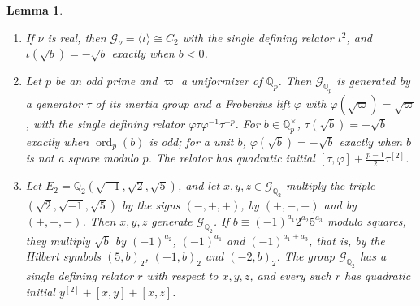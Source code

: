 \documentclass[11pt]{amsart}
\numberwithin{equation}{section}
\newtheorem{lemma}[equation]{Lemma}
\theoremstyle{definition}
\theoremstyle{remark}
\newcommand{\Q}{\mathbb Q}
\begin{document}
\begin{lemma}\label{tw:local-groups}
\begin{enumerate}
\item[(a)] If $\nu$ is real, then $\mathcal G_\nu=\langle\iota\rangle\cong C_2$
 with the single defining relator $\iota^2$, and $\iota(\sqrt b)=-\sqrt b$
 exactly when $b<0$.
\item[(b)] Let $p$ be an odd prime and $\varpi$ a uniformizer of $\Q_p$. Then
 $\mathcal G_{\Q_p}$ is generated by a generator $\tau$ of its inertia group
 and a Frobenius lift $\varphi$ with $\varphi(\sqrt\varpi)=\sqrt\varpi$, with
 the single defining relator $\varphi\tau\varphi^{-1}\tau^{-p}$. For
 $b\in\Q_p^\times$, $\tau(\sqrt b)=-\sqrt b$ exactly when $\operatorname{ord}_p(b)$ is odd;
 for a unit $b$, $\varphi(\sqrt b)=-\sqrt b$ exactly when $b$ is not a square
 modulo $p$. The relator has quadratic initial
 $[\tau,\varphi]+\frac{p-1}2\tau^{[2]}$.
\item[(c)] Let $E_2=\Q_2(\sqrt{-1},\sqrt2,\sqrt5)$, and let
 $x,y,z\in\mathcal G_{\Q_2}$ multiply the triple $(\sqrt2,\sqrt{-1},\sqrt5)$
 by the signs $(-,+,+)$, by $(+,-,+)$ and by $(+,-,-)$. Then $x,y,z$
 generate $\mathcal G_{\Q_2}$. If $b\equiv(-1)^{a_1}2^{a_2}5^{a_3}$ modulo
 squares, they multiply $\sqrt b$ by $(-1)^{a_2}$, $(-1)^{a_1}$ and
 $(-1)^{a_1+a_3}$, that is, by the Hilbert symbols $(5,b)_2$, $(-1,b)_2$ and
 $(-2,b)_2$. The group $\mathcal G_{\Q_2}$ has a single defining relator $r$
 with respect to $x,y,z$, and every such $r$ has quadratic initial
 $y^{[2]}+[x,y]+[x,z]$.
\end{enumerate}
\end{lemma}
\end{document}
